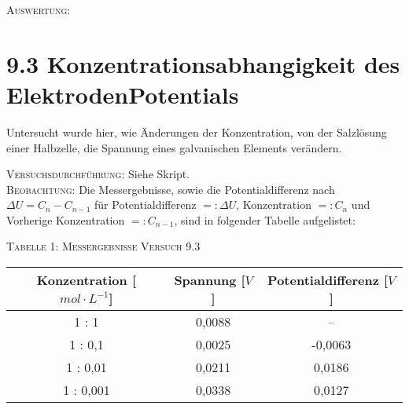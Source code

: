 \documentclass[11pt, a4paper]{article}
\begin{document}
\textsc{Auswertung:}\hspace{8mm} 


\newpage
\section{9.3 Konzentrationsabhangigkeit des ElektrodenPotentials}

Untersucht wurde hier, wie Änderungen der Konzentration, von der Salzlösung einer Halbzelle, die Spannung eines galvanischen Elements verändern.

\textsc{Versuchsdurchführung:} Siehe Skript.\\

\textsc{Beobachtung:}\hspace{5mm} Die Messergebnisse, sowie die Potentialdifferenz nach $\Delta U=C_n-C_{n-1}$ für Potentialdifferenz $=:\Delta U$, Konzentration $=:C_n$ und Vorherige Konzentration $=: C_{n-1}$, sind in folgender Tabelle aufgelistet:\\
\begin{center}
\textsc{Tabelle 1: Messergebnisse Versuch 9.3}\\
\vspace{5mm}
\begin{tabular}{ccc}
Konzentration [$mol\cdot L^{-1}$] & Spannung [$V$] & Potentialdifferenz [$V$]\\
 \hline
 1 : 1 & 0,0088 & --\\
 1 : 0,1 & 0,0025 & -0,0063\\
 1 : 0,01 & 0,0211 & 0,0186\\
 1 : 0,001 & 0,0338 & 0,0127\\
\end{tabular}
\end{center}
\end{document}
